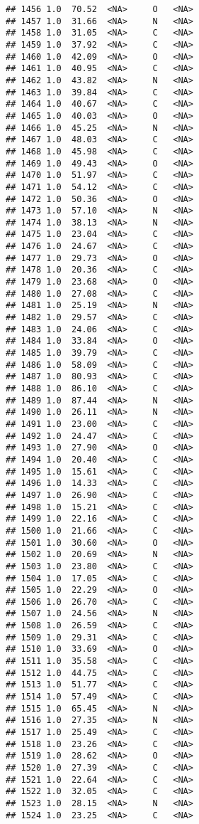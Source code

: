 \documentclass[
]{article}
\begin{document}
\begin{verbatim}
## 1456 1.0  70.52  <NA>     O   <NA>
## 1457 1.0  31.66  <NA>     N   <NA>
## 1458 1.0  31.05  <NA>     C   <NA>
## 1459 1.0  37.92  <NA>     C   <NA>
## 1460 1.0  42.09  <NA>     O   <NA>
## 1461 1.0  40.95  <NA>     C   <NA>
## 1462 1.0  43.82  <NA>     N   <NA>
## 1463 1.0  39.84  <NA>     C   <NA>
## 1464 1.0  40.67  <NA>     C   <NA>
## 1465 1.0  40.03  <NA>     O   <NA>
## 1466 1.0  45.25  <NA>     N   <NA>
## 1467 1.0  48.03  <NA>     C   <NA>
## 1468 1.0  45.98  <NA>     C   <NA>
## 1469 1.0  49.43  <NA>     O   <NA>
## 1470 1.0  51.97  <NA>     C   <NA>
## 1471 1.0  54.12  <NA>     C   <NA>
## 1472 1.0  50.36  <NA>     O   <NA>
## 1473 1.0  57.10  <NA>     N   <NA>
## 1474 1.0  38.13  <NA>     N   <NA>
## 1475 1.0  23.04  <NA>     C   <NA>
## 1476 1.0  24.67  <NA>     C   <NA>
## 1477 1.0  29.73  <NA>     O   <NA>
## 1478 1.0  20.36  <NA>     C   <NA>
## 1479 1.0  23.68  <NA>     O   <NA>
## 1480 1.0  27.08  <NA>     C   <NA>
## 1481 1.0  25.19  <NA>     N   <NA>
## 1482 1.0  29.57  <NA>     C   <NA>
## 1483 1.0  24.06  <NA>     C   <NA>
## 1484 1.0  33.84  <NA>     O   <NA>
## 1485 1.0  39.79  <NA>     C   <NA>
## 1486 1.0  58.09  <NA>     C   <NA>
## 1487 1.0  80.93  <NA>     C   <NA>
## 1488 1.0  86.10  <NA>     C   <NA>
## 1489 1.0  87.44  <NA>     N   <NA>
## 1490 1.0  26.11  <NA>     N   <NA>
## 1491 1.0  23.00  <NA>     C   <NA>
## 1492 1.0  24.47  <NA>     C   <NA>
## 1493 1.0  27.90  <NA>     O   <NA>
## 1494 1.0  20.40  <NA>     C   <NA>
## 1495 1.0  15.61  <NA>     C   <NA>
## 1496 1.0  14.33  <NA>     C   <NA>
## 1497 1.0  26.90  <NA>     C   <NA>
## 1498 1.0  15.21  <NA>     C   <NA>
## 1499 1.0  22.16  <NA>     C   <NA>
## 1500 1.0  21.66  <NA>     C   <NA>
## 1501 1.0  30.60  <NA>     O   <NA>
## 1502 1.0  20.69  <NA>     N   <NA>
## 1503 1.0  23.80  <NA>     C   <NA>
## 1504 1.0  17.05  <NA>     C   <NA>
## 1505 1.0  22.29  <NA>     O   <NA>
## 1506 1.0  26.70  <NA>     C   <NA>
## 1507 1.0  24.56  <NA>     N   <NA>
## 1508 1.0  26.59  <NA>     C   <NA>
## 1509 1.0  29.31  <NA>     C   <NA>
## 1510 1.0  33.69  <NA>     O   <NA>
## 1511 1.0  35.58  <NA>     C   <NA>
## 1512 1.0  44.75  <NA>     C   <NA>
## 1513 1.0  51.77  <NA>     C   <NA>
## 1514 1.0  57.49  <NA>     C   <NA>
## 1515 1.0  65.45  <NA>     N   <NA>
## 1516 1.0  27.35  <NA>     N   <NA>
## 1517 1.0  25.49  <NA>     C   <NA>
## 1518 1.0  23.26  <NA>     C   <NA>
## 1519 1.0  28.62  <NA>     O   <NA>
## 1520 1.0  27.39  <NA>     C   <NA>
## 1521 1.0  22.64  <NA>     C   <NA>
## 1522 1.0  32.05  <NA>     C   <NA>
## 1523 1.0  28.15  <NA>     N   <NA>
## 1524 1.0  23.25  <NA>     C   <NA>

\end{verbatim}
\end{document}
